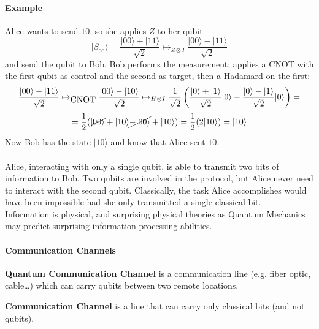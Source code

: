 \documentclass[10pt]{report}
\begin{document}
\paragraph{Example} Alice wants to send $10$, so she applies $Z$ to her qubit
$$|\beta_{00}\rangle = \frac{|00\rangle+|11\rangle}{\sqrt{2}} \mapsto_{Z\otimes I}\frac{|00\rangle-|11\rangle}{\sqrt{2}}$$
and send the qubit to Bob. Bob performs the measurement: applies a CNOT with the first qubit as control and the second as target, then a Hadamard on the first:
$$\frac{|00\rangle-|11\rangle}{\sqrt{2}} \mapsto_{\hbox{CNOT}}\frac{|00\rangle-|10\rangle}{\sqrt{2}}\mapsto_{H\otimes I}\frac{1}{\sqrt{2}}\left(\frac{|0\rangle+|1\rangle}{\sqrt{2}}|0\rangle-\frac{|0\rangle-|1\rangle}{\sqrt{2}}|0\rangle\right)=$$
$$=\frac{1}{2}(\cancel{|00\rangle}+|10\rangle \cancel{-|00\rangle}+|10\rangle) = \frac{1}{2}(2|10\rangle) = |10\rangle$$
Now Bob has the state $|10\rangle$ and know that Alice sent $10$.\\\\
Alice, interacting with only a single qubit, is able to transmit two bits of information to Bob. Two qubits are involved in the protocol, but Alice never need to interact with the second qubit. Classically, the task Alice accomplishes would have been impossible had she only transmitted a single classical bit.\\
Information is physical, and surprising physical theories as Quantum Mechanics may predict surprising information processing abilities.
\paragraph{Communication Channels}
\begin{list}{}{}
	\item \textbf{Quantum Communication Channel} is a communication line (e.g. fiber optic, cable\ldots) which can carry qubits between two remote locations.
	\item \textbf{Communication Channel} is a line that can carry only classical bits (and not qubits).
\end{list}
\end{document}
